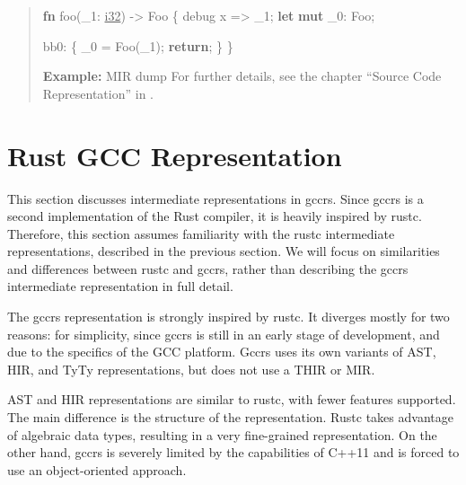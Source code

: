 \documentclass[
  11pt,
  twoside,symmetric]{report}
\newenvironment{Shaded}{}{}
\newcommand{\ControlFlowTok}[1]{\textbf{#1}}
\newcommand{\DataTypeTok}[1]{\underline{#1}}
\newcommand{\KeywordTok}[1]{\textbf{#1}}
\newcommand{\NormalTok}[1]{#1}
\newcommand{\OperatorTok}[1]{#1}
\begin{document}
\begin{quote}
\begin{Shaded}
\begin{Highlighting}[]
\KeywordTok{fn}\NormalTok{ foo(\_1}\OperatorTok{:} \DataTypeTok{i32}\NormalTok{) }\OperatorTok{{-}\textgreater{}}\NormalTok{ Foo }\OperatorTok{\{}
\NormalTok{    debug x }\OperatorTok{=\textgreater{}}\NormalTok{ \_1}\OperatorTok{;}
    \KeywordTok{let} \KeywordTok{mut}\NormalTok{ \_0}\OperatorTok{:}\NormalTok{ Foo}\OperatorTok{;}

\NormalTok{    bb0}\OperatorTok{:} \OperatorTok{\{}
\NormalTok{        \_0 }\OperatorTok{=}\NormalTok{ Foo(\_1)}\OperatorTok{;}
        \ControlFlowTok{return}\OperatorTok{;}
    \OperatorTok{\}}
\OperatorTok{\}}
\end{Highlighting}
\end{Shaded}

\textbf{Example:} MIR dump For further details, see the chapter ``Source
Code Representation'' in .
\end{quote}

\section{Rust GCC Representation}\label{sec:rust-gcc-representation}

This section discusses intermediate representations in gccrs. Since
gccrs is a second implementation of the Rust compiler, it is heavily
inspired by rustc. Therefore, this section assumes familiarity with the
rustc intermediate representations, described in the previous section.
We will focus on similarities and differences between rustc and gccrs,
rather than describing the gccrs intermediate representation in full
detail.

The gccrs representation is strongly inspired by rustc. It diverges
mostly for two reasons: for simplicity, since gccrs is still in an early
stage of development, and due to the specifics of the GCC platform.
Gccrs uses its own variants of AST, HIR, and TyTy representations, but
does not use a THIR or MIR.

AST and HIR representations are similar to rustc, with fewer features
supported. The main difference is the structure of the representation.
Rustc takes advantage of algebraic data types, resulting in a very
fine-grained representation. On the other hand, gccrs is severely
limited by the capabilities of C++11 and is forced to use an
object-oriented approach.
\end{document}
